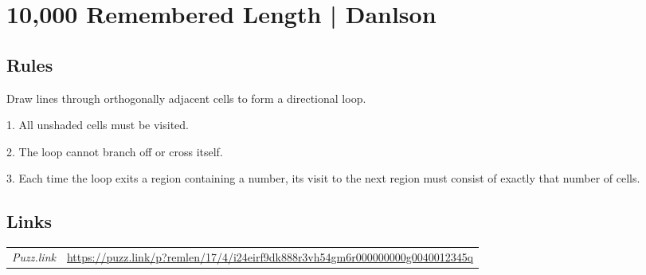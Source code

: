 \section{10,000 Remembered Length | {\normalfont Danlson}}
\label{sec:07-10000-remembered-length-danlson}

\subsection*{Rules}
\begin{markdown}
Draw lines through orthogonally adjacent cells to form a directional loop.

1. All unshaded cells must be visited.

2. The loop cannot branch off or cross itself.

3. Each time the loop exits a region containing a number, its visit to the next region must consist of exactly that number of cells.
\end{markdown}
\subsection*{Links}
\begin{tabularx}{\textwidth}{l X}
\emph{Puzz.link} & \url{https://puzz.link/p?remlen/17/4/i24eirf9dk888r3vh54gm6r000000000g0040012345q} \\
\end{tabularx}
\pagebreak
